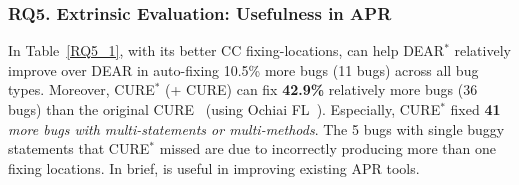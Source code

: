 \subsubsection{\bf RQ5. Extrinsic Evaluation: Usefulness in APR}
In Table~\ref{RQ5_1}, with its better CC fixing-locations, {\tool} can
help DEAR$^{*}$ relatively improve over DEAR in auto-fixing 10.5\%
more bugs (11 bugs) across all bug types. Moreover, CURE$^{*}$
({\tool}+ CURE) can fix {\bf 42.9\%} relatively more bugs (36 bugs)
than the original CURE~\cite{cure-icse21} (using Ochiai
FL~\cite{Ochiai}). Especially, CURE$^{*}$ fixed {\bf 41} {\em more bugs
with multi-statements or multi-methods}. The 5 bugs with
single buggy statements that CURE$^{*}$ missed are due to {\tool}
incorrectly producing more than one fixing locations.
In brief, {\tool} is useful in improving existing APR tools.



